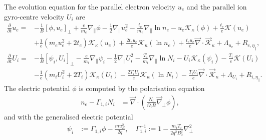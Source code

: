 The evolution equation for the parallel electron velocity \(u_e\) and the parallel ion gyro-centre velocity \(U_i\) are
\begin{align}
\frac{\partial}{\partial t}  u_e
      =&
      - \frac{1 }{ B} \left[ \phi, u_e  \right]_{\perp}
      +  \frac{e}{m_e}   \nabla_\parallel \phi
      -   \frac{1}{2}   \nabla_\parallel u_e^2
      - \frac{t_e}{m_e } \nabla_\parallel \ln  n_e
     - u_e   \mathcal{K}_{\kappa} \left( \phi  \right)
     + \frac{t_e}{e} \mathcal{K}\left(  u_e \right)
     \nonumber  \\    &
     + \frac{1}{e} \left(m_e  u_e^2 +  2  t_e\right)\mathcal{K}_{\kappa} \left(u_e\right)
    + \frac{2  t_e u_e }{ e} \mathcal{K}_{\kappa} \left(\ln n_e \right)
    + \frac{t_e  u_e }{e} \vec{\nabla} \cdot  \vec{\mathcal{K}}_{\kappa}
    +\Lambda_{u_e} + R_{e, \eta_\parallel},  \\
\frac{\partial}{\partial t}    U_i
      =&
      - \frac{1 }{ B} \left[ \psi_i, U_i  \right]_{\perp}
      -  \frac{e}{m_i}   \nabla_\parallel \psi_i
      -     \frac{1}{2}  \nabla_\parallel U_i^2
      - \frac{T_i}{m_i } \nabla_\parallel \ln  N_i
     -  U_i  \mathcal{K}_{\kappa} \left( \psi_i  \right)
     - \frac{T_i}{e} \mathcal{K}\left(  U_i \right)
     \nonumber  \\    &
           - \frac{1}{e}\left(m_i  U_i^2 + 2  T_i \right) \mathcal{K}_{\kappa} \left(U_i\right)
           - \frac{2  T_i U_i }{ e} \mathcal{K}_{\kappa} \left(\ln N_i \right)
           - \frac{T_i  U_i }{e} \vec{\nabla} \cdot  \vec{\mathcal{K}}_{\kappa}
           +\Lambda_{U_i} + R_{i,\eta_\parallel} .
\end{align}
The electric potential \(\phi\) is computed by the polarisation equation
\begin{align}
  n_e -\Gamma_{1,i} N_i &= \vec{\nabla} \cdot\left(\frac{N_i}{\Omega_i B} \vec{\nabla}_\perp \phi\right),
  \label{eq:polarisation_dimensional}
\end{align}
and with the generalised electric potential
\begin{align}
  \psi_i&:= \Gamma_{1,i} \phi - \frac{m u_E^2}{2 q}, \quad \Gamma_{1,i}^{-1} := 1-\frac{m_i T_i}{2q^2 B_0^2} \nabla_\perp^2
\end{align}
